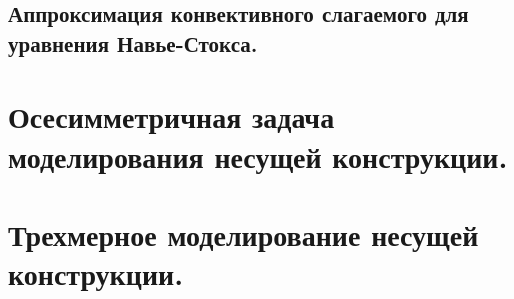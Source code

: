 \documentclass[12pt]{article}
\begin{document}
\subsection{Аппроксимация конвективного слагаемого для уравнения Навье-Стокса.}

\section{Осесимметричная задача моделирования несущей конструкции.}
\subsection{}

\section{Трехмерное моделирование несущей конструкции.}
\subsection{}
\end{document}
